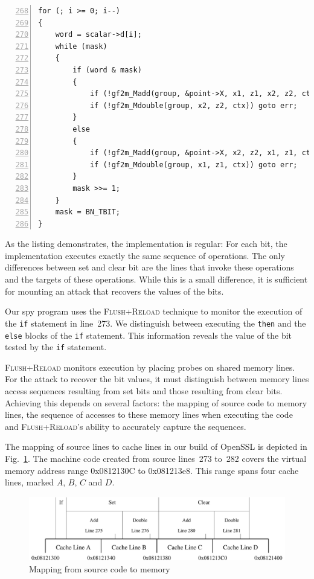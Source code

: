 \documentclass[twocolumn]{svjour3}
\newcommand{\fl}{\textsc{Flu\-sh+\allowbreak Re\-load}\xspace}
\begin{document}
\begin{lstlisting}[numbers=left,firstnumber=268,float=htb,caption=OpenSSL implementation of the Montgomery ladder,label=lst:openssl]
for (; i >= 0; i--)
{
    word = scalar->d[i];
    while (mask)
    {
        if (word & mask)
        {
            if (!gf2m_Madd(group, &point->X, x1, z1, x2, z2, ctx)) goto err;
            if (!gf2m_Mdouble(group, x2, z2, ctx)) goto err;
        }
        else
        {
            if (!gf2m_Madd(group, &point->X, x2, z2, x1, z1, ctx)) goto err;
            if (!gf2m_Mdouble(group, x1, z1, ctx)) goto err;
        }
        mask >>= 1;
    }
    mask = BN_TBIT;
}
\end{lstlisting}

As the listing demonstrates, the implementation is regular: For each bit, the implementation executes exactly the same sequence of operations.
The only differences between set and clear bit are the lines that invoke these operations and the targets of these operations.
While this is a small difference, it is sufficient for mounting an attack that recovers 
the values of the bits.


Our spy program uses the \fl technique to monitor the execution of the \texttt{if}
statement in line~273.
We distinguish between executing the \texttt{then} and the \texttt{else} blocks of the \texttt{if}
statement.
This information reveals the value of the bit tested by the \texttt{if} statement.

\fl monitors execution by placing probes on shared memory lines.
For the attack to recover the bit values, it must distinguish between memory lines access sequences
resulting from set bits and those resulting from clear bits.
Achieving this depends on several factors: the mapping of source code to memory lines, 
the sequence of accesses to these memory lines when executing the code and 
\fl's ability to accurately capture the sequences.


The mapping of source lines to cache lines in our build of OpenSSL is depicted in Fig.~\ref{dgm:memory}.
The machine code created from source lines~273 to~282 covers the virtual memory address range 0x0812130C
to 0x081213e8.
This range spans four cache lines, marked $A$, $B$, $C$ and $D$.


\begin{figure}[htb]
\centering\includegraphics[width=\columnwidth]{images/memory}
\caption{Mapping from source code to memory\label{dgm:memory}}
\end{figure}
\end{document}
